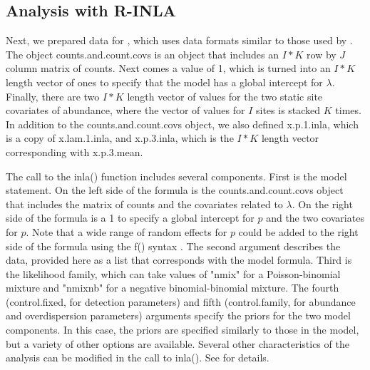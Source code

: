 \documentclass[article]{jss}
\begin{document}
\subsection[Analysis with R-INLA]{Analysis with R-INLA}
Next, we prepared data for , which uses data formats similar to those used by . The object counts.and.count.covs is an  object that includes an $I*K$ row by $J$ column matrix of counts. Next comes a value of 1, which is turned into an $I*K$ length vector of ones to specify that the model has a global intercept for $\lambda$. Finally, there are two $I*K$ length vector of values for the two static site covariates of abundance, where the vector of values for $I$ sites is stacked $K$ times. In addition to the counts.and.count.covs object, we also defined x.p.1.inla, which is a copy of x.lam.1.inla, and x.p.3.inla, which is the $I*K$ length vector corresponding with x.p.3.mean.


The call to the inla() function includes several components. First is the model statement. On the left side of the formula is the counts.and.count.covs object that includes the matrix of counts and the covariates related to $\lambda$.  On the right side of the formula is a 1 to specify a global intercept for $p$ and the two covariates for $p$.  Note that a wide range of random effects for $p$ could be added to the right side of the formula using the f() syntax \citep{Rue_Martino_Lindgren_Simpson_Riebler_2013}. The second argument describes the data, provided here as a list that corresponds with the model formula. Third is the likelihood family, which can take values of "nmix" for a Poisson-binomial mixture and "nmixnb" for a negative binomial-binomial mixture. The fourth (control.fixed, for detection parameters) and fifth (control.family, for abundance and overdispersion parameters) arguments specify the priors for the two model components. In this case, the priors are specified similarly to those in the  model, but a variety of other options are available. Several other characteristics of the analysis can be modified in the call to inla(). See \cite{Rue_Martino_Lindgren_Simpson_Riebler_2013} for details.
\end{document}

